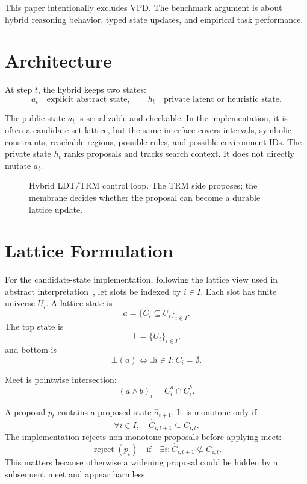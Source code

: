 \documentclass[11pt]{article}
\begin{document}
This paper intentionally excludes VPD. The benchmark argument is about hybrid reasoning behavior, typed state updates, and empirical task performance.

\section{Architecture}

At step $t$, the hybrid keeps two states:
\[
  a_t \quad \text{explicit abstract state}, \qquad
  h_t \quad \text{private latent or heuristic state}.
\]

The public state $a_t$ is serializable and checkable. In the implementation, it is often a candidate-set lattice, but the same interface covers intervals, symbolic constraints, reachable regions, possible rules, and possible environment IDs. The private state $h_t$ ranks proposals and tracks search context. It does not directly mutate $a_t$.

\begin{figure}[t]
\centering

\caption{Hybrid LDT/TRM control loop. The TRM side proposes; the membrane decides whether the proposal can become a durable lattice update.}
\label{fig:architecture}
\end{figure}

\section{Lattice Formulation}

For the candidate-state implementation, following the lattice view used in abstract interpretation~\cite{cousot1977abstract}, let slots be indexed by $i \in I$. Each slot has finite universe $U_i$. A lattice state is
\[
  a = \{ C_i \subseteq U_i \}_{i \in I}.
\]
The top state is
\[
  \top = \{ U_i \}_{i \in I},
\]
and bottom is
\[
  \bot(a) \iff \exists i \in I : C_i = \emptyset.
\]

Meet is pointwise intersection:
\[
  (a \wedge b)_i = C_i^a \cap C_i^b.
\]

A proposal $p_t$ contains a proposed state $\hat a_{t+1}$. It is monotone only if
\[
  \forall i \in I,\quad \hat C_{i,t+1} \subseteq C_{i,t}.
\]
The implementation rejects non-monotone proposals before applying meet:
\[
  \operatorname{reject}(p_t) \quad \text{if} \quad \exists i:\hat C_{i,t+1} \nsubseteq C_{i,t}.
\]
This matters because otherwise a widening proposal could be hidden by a subsequent meet and appear harmless.
\end{document}
